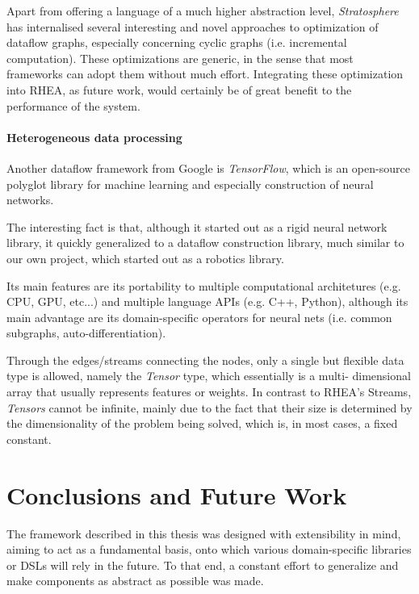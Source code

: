 \documentclass[sigplan,review,anonymous]{acmart}
\begin{document}
Apart from offering a language of a much higher abstraction level,
\textit{Stratosphere} has internalised several interesting and novel approaches
to optimization of dataflow graphs, especially concerning cyclic graphs (i.e.
incremental computation)\cite{spinning}. These optimizations are generic, in the
sense that most frameworks can adopt them without much effort. Integrating these
optimization into \textsc{RHEA}, as future work, would certainly be of great
benefit to the performance of the system.

\paragraph{Heterogeneous data processing}


Another dataflow framework from Google is
\textit{TensorFlow}, which is an open-source
polyglot library for machine learning and especially construction of neural
networks.

The interesting fact is that, although it started out as a rigid neural network
library, it quickly generalized to a dataflow construction library, much similar
to our own project, which started out as a robotics library.

Its main features are its portability to multiple computational architetures
(e.g. CPU, GPU, etc...) and multiple language APIs (e.g. C++, Python), although
its main advantage are its domain-specific operators for neural nets (i.e.
common subgraphs, auto-differentiation).

Through the edges/streams connecting the nodes, only a single but flexible data
type is allowed, namely the \textit{Tensor} type, which essentially is a multi-
dimensional array that usually represents features or weights. In contrast to
\textsc{RHEA}'s Streams, \textit{Tensors} cannot be infinite, mainly due to the
fact that their size is determined by the dimensionality of the problem being
solved, which is, in most cases, a fixed constant.

\section{Conclusions and Future Work} \label{sec:conclusions}

The framework described in this thesis was designed with extensibility in mind,
aiming to act as a fundamental basis, onto which various domain-specific
libraries or DSLs will rely in the future. To that end, a constant effort to
generalize and make components as abstract as possible was made.
\end{document}
